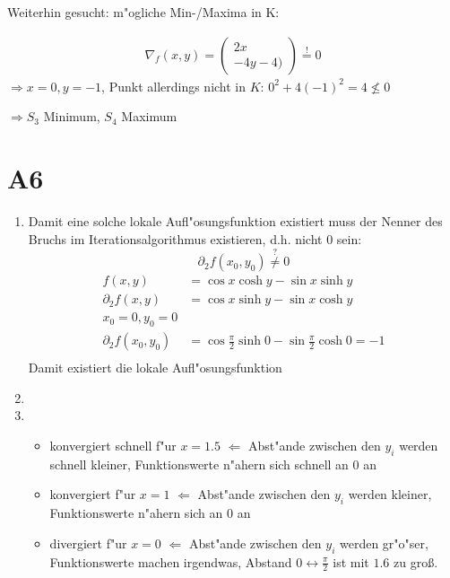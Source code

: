 \documentclass[fleqn,12pt]{scrartcl}
\begin{document}
\begin{enumerate}
			Weiterhin gesucht: m"ogliche Min-/Maxima in K:

			\begin{align*}
			\nabla_f(x,y) = \begin{pmatrix} 2x \\ -4y-4)\end{pmatrix} \overset!= 0
			\end{align*}
			$\Rightarrow x =0, y=-1$, Punkt  allerdings nicht in $K$: $0^2 + 4(-1)^2 = 4 \nleqslant 0$

			$\Rightarrow S_3$ Minimum, $S_4$ Maximum



	\end{enumerate}
	\section*{A6}
	\begin{enumerate}
		\item
			Damit eine solche lokale Aufl"osungsfunktion existiert muss der Nenner des Bruchs im Iterationsalgorithmus existieren, d.h. nicht 0 sein:
			\begin{equation*}
				\partial_2f(x_0,y_0) \overset?\neq 0
			\end{equation*}
			\begin{align*}
				f(x,y) &= 
				\cos x \cosh y - \sin x \sinh y\\
				\partial_2f(x,y) &= \cos x \sinh y - \sin x \cosh y\\
				x_0 = 0, y_0 = 0\\
				\partial_2f(x_0,y_0) &= \cos \frac{\pi}2 \sinh 0 - \sin \frac{\pi}2 \cosh 0 = -1\\
			\end{align*}
			Damit existiert die lokale Aufl"osungsfunktion

			\newpage
		\item
			
\item
	\begin{itemize}
		\item
			konvergiert schnell f"ur $x=1.5$ $\Leftarrow$ Abst"ande zwischen den $y_i$ werden schnell kleiner, Funktionswerte n"ahern sich schnell an 0 an
		\item
			konvergiert f"ur $x=1$ $\Leftarrow$ Abst"ande zwischen den $y_i$ werden kleiner, Funktionswerte n"ahern sich an 0 an

		\item
		divergiert f"ur $x=0$ $\Leftarrow$ Abst"ande zwischen den $y_i$ werden gr"o"ser, Funktionswerte machen irgendwas, Abstand $0 \leftrightarrow \frac\pi2$ ist mit $1.6$ zu groß.
	\end{itemize}

	\end{enumerate}



	
\end{document}
